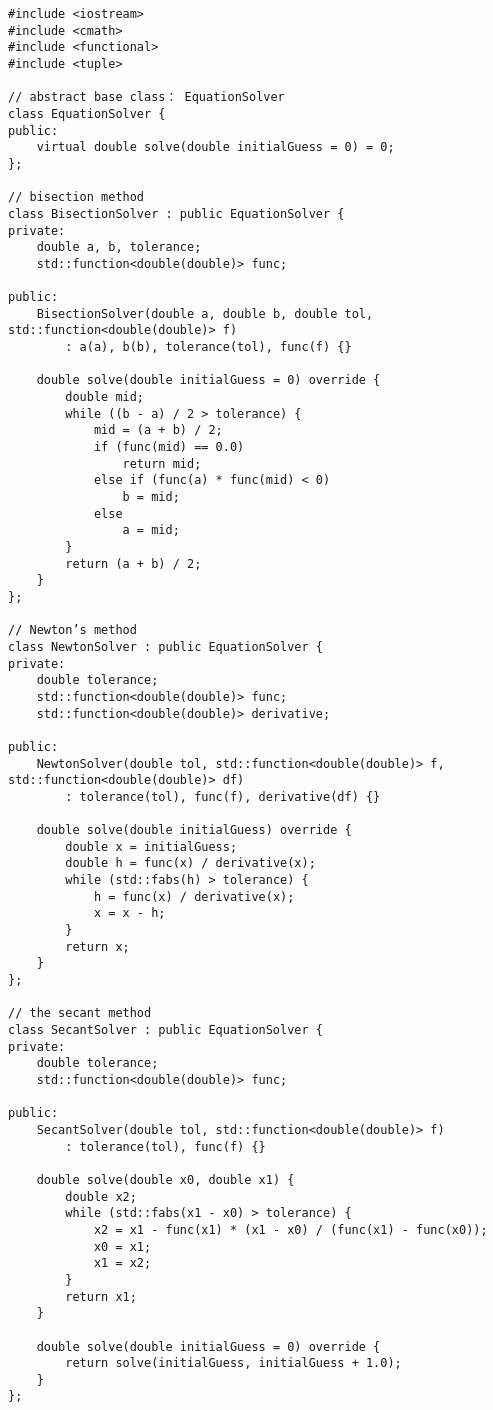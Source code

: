 \documentclass[a4paper]{article}
\begin{document}
\begin{lstlisting}
#include <iostream>
#include <cmath>
#include <functional>
#include <tuple>  

// abstract base class： EquationSolver
class EquationSolver {
public:
    virtual double solve(double initialGuess = 0) = 0;
};

// bisection method
class BisectionSolver : public EquationSolver {
private:
    double a, b, tolerance;
    std::function<double(double)> func;

public:
    BisectionSolver(double a, double b, double tol, std::function<double(double)> f)
        : a(a), b(b), tolerance(tol), func(f) {}

    double solve(double initialGuess = 0) override {
        double mid;
        while ((b - a) / 2 > tolerance) {
            mid = (a + b) / 2;
            if (func(mid) == 0.0)
                return mid;
            else if (func(a) * func(mid) < 0)
                b = mid;
            else
                a = mid;
        }
        return (a + b) / 2;
    }
};

// Newton’s method
class NewtonSolver : public EquationSolver {
private:
    double tolerance;
    std::function<double(double)> func;
    std::function<double(double)> derivative;

public:
    NewtonSolver(double tol, std::function<double(double)> f, std::function<double(double)> df)
        : tolerance(tol), func(f), derivative(df) {}

    double solve(double initialGuess) override {
        double x = initialGuess;
        double h = func(x) / derivative(x);
        while (std::fabs(h) > tolerance) {
            h = func(x) / derivative(x);
            x = x - h;
        }
        return x;
    }
};

// the secant method
class SecantSolver : public EquationSolver {
private:
    double tolerance;
    std::function<double(double)> func;

public:
    SecantSolver(double tol, std::function<double(double)> f)
        : tolerance(tol), func(f) {}

    double solve(double x0, double x1) {
        double x2;
        while (std::fabs(x1 - x0) > tolerance) {
            x2 = x1 - func(x1) * (x1 - x0) / (func(x1) - func(x0));
            x0 = x1;
            x1 = x2;
        }
        return x1;
    }

    double solve(double initialGuess = 0) override {
        return solve(initialGuess, initialGuess + 1.0);
    }
};
\end{lstlisting}
\end{document}
